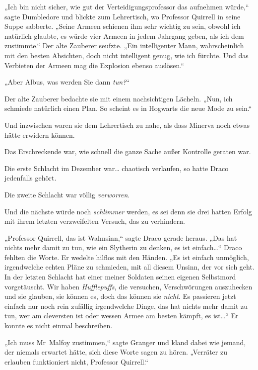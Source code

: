 {„Ich bin nicht sicher, wie gut der Verteidigungsprofessor das aufnehmen würde,“ sagte Dumbledore und blickte zum Lehrertisch, wo Professor Quirrell in seine Suppe sabberte. „Seine Armeen schienen ihm sehr wichtig zu sein, obwohl ich natürlich glaubte, es würde vier Armeen in jedem Jahrgang geben, als ich dem zustimmte.“ Der alte Zauberer seufzte. „Ein intelligenter Mann, wahrscheinlich mit den besten Absichten, doch nicht intelligent genug, wie ich fürchte. Und das Verbieten der Armeen mag die Explosion ebenso auslösen.“

„Aber Albus, was werden Sie dann \emph{tun?}“

Der alte Zauberer bedachte sie mit einem nachsichtigen Lächeln. „Nun, ich schmiede natürlich einen Plan. So scheint es in Hogwarts die neue Mode zu sein.“

Und inzwischen waren sie dem Lehrertisch zu nahe, als dass Minerva noch etwas hätte erwidern können.

\later

Das Erschreckende war, wie schnell die ganze Sache außer Kontrolle geraten war.

Die erste Schlacht im Dezember war… chaotisch verlaufen, so hatte Draco jedenfalls gehört.

Die zweite Schlacht war völlig \emph{verworren}.

Und die nächste würde noch \emph{schlimmer} werden, es sei denn sie drei hatten Erfolg mit ihrem letzten verzweifelten Versuch, das zu verhindern.

„Professor Quirrell, das ist Wahnsinn,“ sagte Draco gerade heraus. „Das hat nichts mehr damit zu tun, wie ein Slytherin zu denken, es ist einfach…“ Draco fehlten die Worte. Er wedelte hilflos mit den Händen. „Es ist einfach unmöglich, irgendwelche echten Pläne zu schmieden, mit all diesem Unsinn, der vor sich geht. In der letzten Schlacht hat einer meiner Soldaten seinen eigenen Selbstmord vorgetäuscht. Wir haben \emph{Hufflepuffs}, die versuchen, Verschwörungen auszuhecken und sie glauben, sie können es, doch das können sie \emph{nicht}. Es passieren jetzt einfach nur noch rein zufällig irgendwelche Dinge, das hat nichts mehr damit zu tun, wer am cleversten ist oder wessen Armee am besten kämpft, es ist…“ Er konnte es nicht einmal beschreiben.

„Ich muss Mr~Malfoy zustimmen,“ sagte Granger und kland dabei wie jemand, der niemals erwartet hätte, sich diese Worte sagen zu hören. „Verräter zu erlauben funktioniert nicht, Professor Quirrell.“

}
